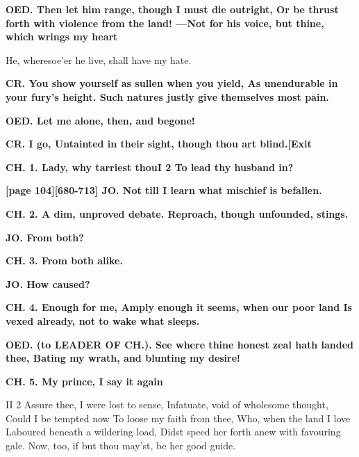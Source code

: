 \documentclass[11pt,letter]{book}
\begin{document}
\par \textbf{OED. Then let him range, though I must die outright, Or be thrust forth with violence from the land! —Not for his voice, but thine, which wrings my heart}
\par   He, wheresoe’er he live, shall have my hate.

\par \textbf{CR. You show yourself as sullen when you yield, As unendurable in your fury’s height. Such natures justly give themselves most pain.}
\par 

\par \textbf{OED. Let me alone, then, and begone!}
\par 

\par \textbf{CR. I go, Untainted in their sight, though thou art blind.[Exit}
\par 

\par \textbf{CH. 1. Lady, why tarriest thouI 2 To lead thy husband in?}
\par 

\par \textbf{[page 104][680-713] JO. Not till I learn what mischief is befallen.}
\par 

\par \textbf{CH. 2. A dim, unproved debate. Reproach, though unfounded, stings.}
\par 

\par \textbf{JO. From both?}
\par 

\par \textbf{CH. 3. From both alike.}
\par 

\par \textbf{JO. How caused?}
\par 

\par \textbf{CH. 4. Enough for me, Amply enough it seems, when our poor land Is vexed already, not to wake what sleeps.}
\par 

\par \textbf{OED. (to LEADER OF CH.). See where thine honest zeal hath landed thee, Bating my wrath, and blunting my desire!}
\par 

\par \textbf{CH. 5. My prince, I say it again}
\par  II 2 Assure thee, I were lost to sense, Infatuate, void of wholesome thought, Could I be tempted now To loose my faith from thee, Who, when the land I love Laboured beneath a wildering load, Didst speed her forth anew with favouring gale. Now, too, if but thou may’st, be her good guide.
\end{document}
